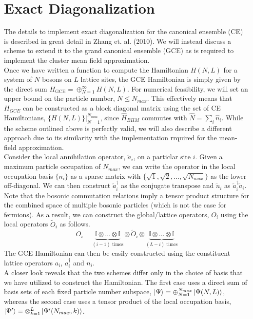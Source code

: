\section{Exact Diagonalization}\label{sec:ed_imp}
The details to implement exact diagonalization for the canonical ensemble (CE) is described in great detail in Zhang et. al. (2010)\cite{Zhang_2010}. We will instead discuss a scheme to extend it to the grand canonical ensemble (GCE) as is required to implement the cluster mean field approximation.
\vspace{0.5cm}\\
Once we have written a function to compute the Hamiltonian $H(N, L)$ for a system of $N$ bosons on $L$ lattice sites, the GCE Hamiltonian is simply given by the direct sum $H_{\text{GCE}} = \oplus_{N = 1}^{\infty} H(N, L)$. For numerical feasibility, we will set an upper bound on the particle number, $N \leq N_{max}$. This effectively means that $H_{GCE}$ can be constructed as a block diagonal matrix using the set of CE Hamiltonians, $\{H(N, L)\}|_{N=1}^{N_{max}}$, since $\hat{H}_{BHM}$ commutes with $\hat{N} = \sum_{i} \hat{n}_i$. While the scheme outlined above is perfectly valid, we will also describe a different approach due to its similarity with the implementation rrquired for the mean-field approximation. 
\vspace{0.5cm}\\
Consider the local annihilation operator, $\tilde a_i$, on a particlar site $i$. Given a maximum particle occupation of $N_{max}$, we can write the operator in the local occupation basis $\{n_i\}$ as a sparse matrix with $\{ \sqrt{1}, \sqrt{2}, \dots, \sqrt{N_{max}}\}$ as the lower off-diagonal. We can then construct $\tilde a_i^{\dagger}$ as the conjugate transpose and $\tilde n_i$ as $\tilde a_i^{\dagger} \tilde a_i$. Note that the bosonic commutation relations imply a tensor product structure for the combined space of multiple bosonic particles (which is not the case for fermions). As a result, we can construct the global/lattice operators, $O_i$ using the local operators $\tilde O_i$ as follows.
\begin{equation}
    O_i = \underbrace{\mathbb{I} \otimes \dots \otimes \mathbb{I}}_{(i-1)\text{ times}} \otimes \tilde O_i \otimes \underbrace{\mathbb{I} \otimes \dots \otimes \mathbb{I}}_{(L - i) \text{ times}} 
\end{equation}
The GCE Hamiltonian can then be easily constructed using the constituent lattice operators $a_i$, $a_i^{\dagger}$ and $n_i$. 
\vspace{0.5cm}\\
A closer look reveals that the two schemes differ only in the choice of basis that we have utilized to construct the Hamiltonian. The first case uses a direct sum of basis sets of each fixed particle number subspace, $\ket{\Psi} = \oplus_{N=1}^{N_{max}}\ket{\Psi(N, L)}$, whereas the second case uses a tensor product of the local occupation basis, $\ket{\Psi'} = \otimes_{k=1}^{L}\ket{\Psi'(N_{max}, k)}$.

